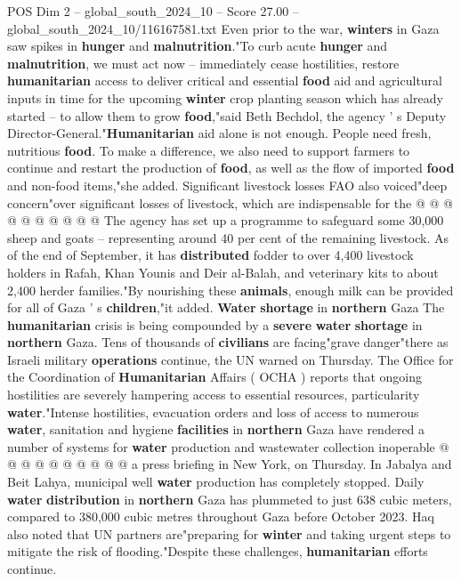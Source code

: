 \begin{textsample}{POS Dim 2 – global\_south\_2024\_10 – Score 27.00 – global\_south\_2024\_10/116167581.txt}
Even prior to the war, \textbf{winters} in Gaza saw spikes in \textbf{hunger} and \textbf{malnutrition}."To curb acute \textbf{hunger} and \textbf{malnutrition}, we must act now -- immediately cease hostilities, restore \textbf{humanitarian} access to deliver critical and essential \textbf{food} aid and agricultural inputs in time for the upcoming \textbf{winter} crop planting season which has already started -- to allow them to grow \textbf{food},"said Beth Bechdol, the agency ' s Deputy Director-General."\textbf{Humanitarian} aid alone is not enough.
People need fresh, nutritious \textbf{food}.
To make a difference, we also need to support farmers to continue and restart the production of \textbf{food}, as well as the flow of imported \textbf{food} and non-food items,"she added.
Significant livestock losses FAO also voiced"deep concern"over significant losses of livestock, which are indispensable for the @ @ @ @ @ @ @ @ @ @ The agency has set up a programme to safeguard some 30,000 sheep and goats -- representing around 40 per cent of the remaining livestock.
As of the end of September, it has \textbf{distributed} fodder to over 4,400 livestock holders in Rafah, Khan Younis and Deir al-Balah, and veterinary kits to about 2,400 herder families."By nourishing these \textbf{animals}, enough milk can be provided for all of Gaza ' s \textbf{children},"it added. \textbf{Water} \textbf{shortage} in \textbf{northern} Gaza The \textbf{humanitarian} crisis is being compounded by a \textbf{severe} \textbf{water} \textbf{shortage} in \textbf{northern} Gaza.
Tens of thousands of \textbf{civilians} are facing"grave danger"there as Israeli military \textbf{operations} continue, the UN warned on Thursday.
The Office for the Coordination of \textbf{Humanitarian} Affairs ( OCHA ) reports that ongoing hostilities are severely hampering access to essential resources, particularity \textbf{water}."Intense hostilities, evacuation orders and loss of access to numerous \textbf{water}, sanitation and hygiene \textbf{facilities} in \textbf{northern} Gaza have rendered a number of systems for \textbf{water} production and wastewater collection inoperable @ @ @ @ @ @ @ @ @ @ a press briefing in New York, on Thursday.
In Jabalya and Beit Lahya, municipal well \textbf{water} production has completely stopped.
Daily \textbf{water} \textbf{distribution} in \textbf{northern} Gaza has plummeted to just 638 cubic meters, compared to 380,000 cubic metres throughout Gaza before October 2023.
Haq also noted that UN partners are"preparing for \textbf{winter} and taking urgent steps to mitigate the risk of flooding."Despite these challenges, \textbf{humanitarian} efforts continue.

\end{textsample}
